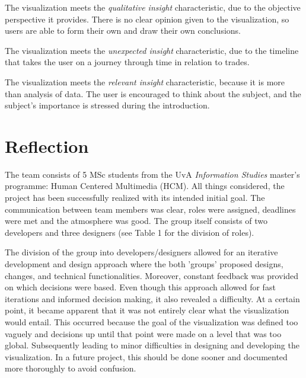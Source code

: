 The visualization meets the \textit{qualitative insight} characteristic, due to the objective perspective it provides. There is no clear opinion given to the visualization, so users are able to form their own and draw their own conclusions. 

The visualization meets the \textit{unexpected insight} characteristic, due to the timeline that takes the user on a journey through time in relation to trades. 

The visualization meets the \textit{relevant insight} characteristic, because it is more than analysis of data. The user is encouraged to think about the subject, and the subject's importance is stressed during the introduction.

\section{Reflection} \label{reflection}
The team consists of 5 MSc students from the UvA \textit{Information Studies} master's programme: Human Centered Multimedia (HCM). All things considered, the project has been successfully realized with its intended initial goal. The communication between team members was clear, roles were assigned, deadlines were met and the atmosphere was good. The group itself consists of two developers and three designers (see Table 1 for the division of roles). 
 
The division of the group into developers/designers allowed for an iterative development and design approach where the both 'groups' proposed designs, changes, and technical functionalities. Moreover, constant feedback was provided on which decisions were based. Even though this approach allowed for fast iterations and informed decision making, it also revealed a difficulty. At a certain point, it became apparent that it was not entirely clear what the visualization would entail. This occurred because the goal of the visualization was defined too vaguely and decisions up until that point were made on a level that was too global. Subsequently leading to minor difficulties in designing and developing the visualization. In a future project, this should be done sooner and documented more thoroughly to avoid confusion.  












